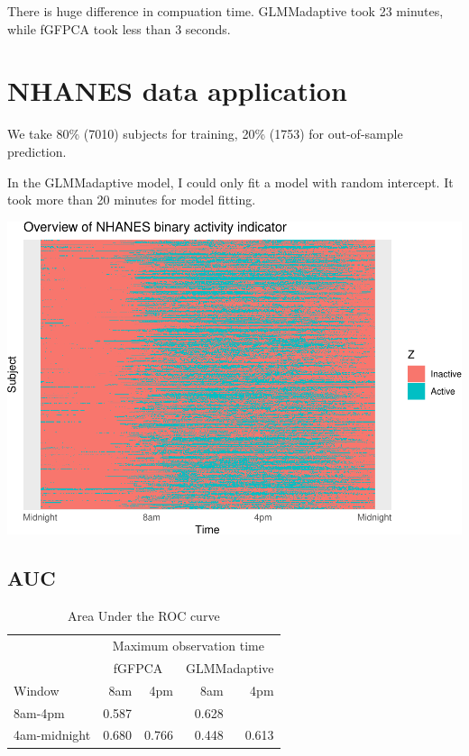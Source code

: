 \documentclass[
]{article}
\begin{document}
There is huge difference in compuation time. GLMMadaptive took 23
minutes, while fGFPCA took less than 3 seconds.

\hypertarget{nhanes-data-application}{%
\section{NHANES data application}\label{nhanes-data-application}}

We take 80\% (7010) subjects for training, 20\% (1753) for out-of-sample
prediction.

In the GLMMadaptive model, I could only fit a model with random
intercept. It took more than 20 minutes for model fitting.

\includegraphics{manuscript_files/figure-latex/nhance_example-1.pdf}

\hypertarget{auc-2}{%
\subsection{AUC}\label{auc-2}}

\begin{table}

\caption{\label{tab:unnamed-chunk-10}Area Under the ROC curve}
\centering
\begin{tabular}[t]{lrrrr}
\toprule
\multicolumn{1}{c}{ } & \multicolumn{4}{c}{Maximum observation time} \\
\cmidrule(l{3pt}r{3pt}){2-5}
\multicolumn{1}{c}{ } & \multicolumn{2}{c}{fGFPCA} & \multicolumn{2}{c}{GLMMadaptive} \\
\cmidrule(l{3pt}r{3pt}){2-3} \cmidrule(l{3pt}r{3pt}){4-5}
Window & 8am & 4pm & 8am & 4pm\\
\midrule
8am-4pm & 0.587 &  & 0.628 & \\
4am-midnight & 0.680 & 0.766 & 0.448 & 0.613\\
\bottomrule
\end{tabular}
\end{table}
\end{document}
